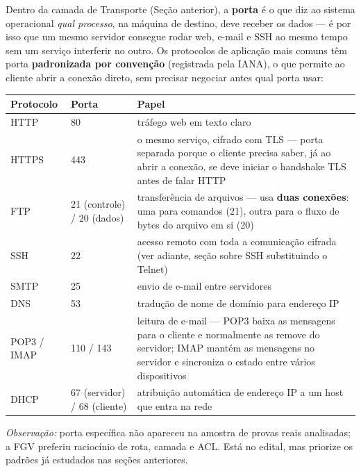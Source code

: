 \begin{conceito}
Dentro da camada de Transporte (Seção anterior), a \textbf{porta} é o que
diz ao sistema operacional \emph{qual processo}, na máquina de destino,
deve receber os dados --- é por isso que um mesmo servidor consegue rodar
web, e-mail e SSH ao mesmo tempo sem um serviço interferir no outro. Os
protocolos de aplicação mais comuns têm porta \textbf{padronizada por
convenção} (registrada pela IANA), o que permite ao cliente abrir a
conexão direto, sem precisar negociar antes qual porta usar:

\begin{center}
\begin{tabular}{@{}p{2.6cm}p{2.3cm}p{6.3cm}@{}}
\toprule
\textbf{Protocolo} & \textbf{Porta} & \textbf{Papel} \\
\midrule
HTTP & 80 & tráfego web em texto claro \\
HTTPS & 443 & o mesmo serviço, cifrado com TLS --- porta separada porque o
cliente precisa saber, já ao abrir a conexão, se deve iniciar o handshake
TLS antes de falar HTTP \\
FTP & 21 (controle) / 20 (dados) & transferência de arquivos --- usa
\textbf{duas conexões}: uma para comandos (21), outra para o fluxo de bytes
do arquivo em si (20) \\
SSH & 22 & acesso remoto com toda a comunicação cifrada (ver adiante, seção
sobre SSH substituindo o Telnet) \\
SMTP & 25 & envio de e-mail entre servidores \\
DNS & 53 & tradução de nome de domínio para endereço IP \\
POP3 / IMAP & 110 / 143 & leitura de e-mail --- POP3 baixa as mensagens
para o cliente e normalmente as remove do servidor; IMAP mantém as
mensagens no servidor e sincroniza o estado entre vários dispositivos \\
DHCP & 67 (servidor) / 68 (cliente) & atribuição automática de endereço IP
a um host que entra na rede \\
\bottomrule
\end{tabular}
\end{center}
\end{conceito}

\textit{Observação:} porta específica não apareceu na amostra de provas
reais analisadas; a FGV preferiu raciocínio de rota, camada e ACL. Está no
edital, mas priorize os padrões já estudados nas seções anteriores.

